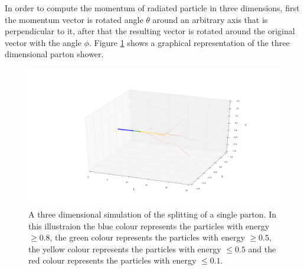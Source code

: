In order to compute the momentum of radiated particle in three dimensions, first the momentum vector is rotated angle $\theta$ around an arbitrary axis that is perpendicular to it, after that the resulting vector is rotated around the original vector with the angle $\phi$.
Figure \ref{fig:3dparton} shows a graphical representation of the three dimensional parton shower. 

%
%
% 
\begin{figure}[H]
\centering
\includegraphics[scale=.3]{images/3D_partonshower.png}
\caption{A three dimensional simulation of the splitting of a single parton. In this illustraion the blue colour represents the particles with energy $\geq 0.8$, the green colour represents the particles with energy $\geq 0.5$, the yellow colour represents the particles with energy $\leq 0.5$ and the red colour represents the particles with energy $\leq 0.1$.}\label{fig:3dparton}
\end{figure}
%
